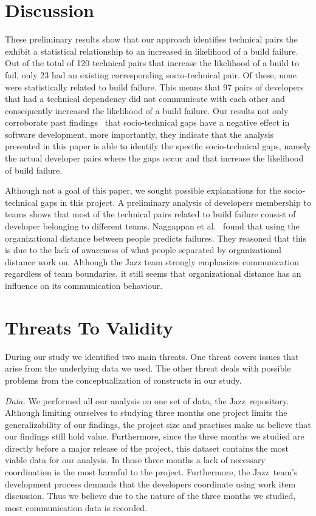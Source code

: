 \documentclass[conference]{IEEEtran}
\begin{document}
\section{Discussion}
These preliminary results show that our approach identifies technical pairs the exhibit a statistical relationship to an increased in likelihood of a build failure.
Out of the total of 120 technical pairs that increase the likelihood of a
build to fail, only 23 had an existing
corresponding socio-technical pair. Of these, none were statistically
related to build failure. This means that 97 pairs of developers that had a
technical dependency did not communicate with each other and
consequently increased the likelihood of a build failure. Our results not only
corroborate past findings~\cite{cataldo:cscw:2006,cataldo:esem:2008} that socio-technical gaps
have a negative effect in software development, more importantly, they indicate
that the analysis presented in this paper is able to identify the specific
socio-technical gaps, namely the actual developer pairs where the gaps occur
and that increase the likelihood of build failure. 

Although not a goal of this paper, we sought possible explanations for the
socio-technical gaps in this project. A preliminary analysis of developers
membership to teams shows that most
of the technical pairs related to build failure consist of developer belonging to
different teams. Naggappan et al.~\cite{nagappan:icse:2008} found that using the
organizational distance between people predicts failures. They reasoned that this
is due to the lack of awareness of what people separated by organizational distance
work on. Although the Jazz team strongly emphasizes communication
regardless of team boundaries, it still seems that organizational distance has
an influence on its communication behaviour.


\section{Threats To Validity}
\label{sec:threats}
During our study we identified two main threats. 
One threat covers issues that arise from the underlying data we used.
The other threat deals with possible problems from the conceptualization of
constructs in our study.

\emph{Data.}
We performed all our analysis on one set of data, the Jazz\texttrademark\
repository. 
Although limiting ourselves to studying three months one project limits the generalizability of our findings, the  
project size and practises make us believe that our findings still hold value.
Furthermore, since the three months  we studied are directly before a major release of the project, this dataset contains the most viable data for our analysis. In those three months a lack of necessary coordination is the most harmful to the project.
Furthermore, the Jazz\texttrademark\ team's development process demands that the developers
coordinate using work item discussion. 
Thus we believe due to the nature of the three months we studied, most communication data is recorded.
\end{document}
